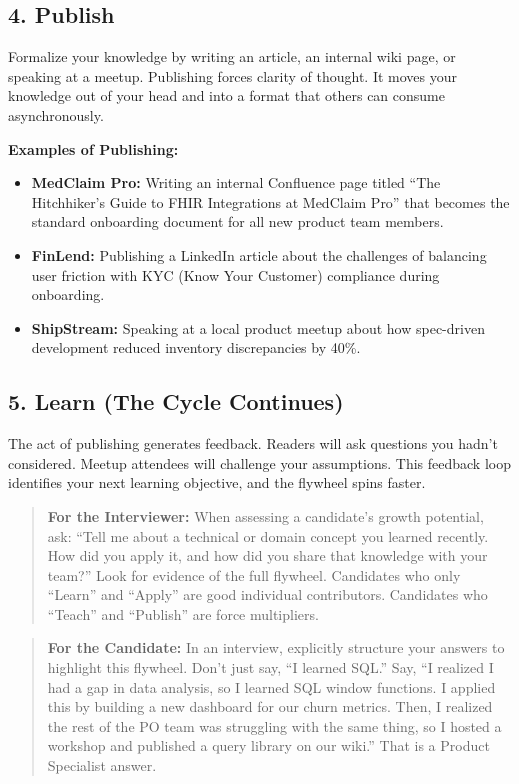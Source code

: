 \subsection{4. Publish}\label{publish}

Formalize your knowledge by writing an article, an internal wiki page,
or speaking at a meetup. Publishing forces clarity of thought. It moves
your knowledge out of your head and into a format that others can
consume asynchronously.

\textbf{Examples of Publishing:}

\begin{itemize}
\tightlist
\item
  \textbf{MedClaim Pro:} Writing an internal Confluence page titled
  ``The Hitchhiker's Guide to FHIR Integrations at MedClaim Pro'' that
  becomes the standard onboarding document for all new product team
  members.
\item
  \textbf{FinLend:} Publishing a LinkedIn article about the challenges
  of balancing user friction with KYC (Know Your Customer) compliance
  during onboarding.
\item
  \textbf{ShipStream:} Speaking at a local product meetup about how
  spec-driven development reduced inventory discrepancies by 40\%.
\end{itemize}

\subsection{5. Learn (The Cycle
Continues)}\label{learn-the-cycle-continues}

The act of publishing generates feedback. Readers will ask questions you
hadn't considered. Meetup attendees will challenge your assumptions.
This feedback loop identifies your next learning objective, and the
flywheel spins faster.

\begin{quote}
\textbf{For the Interviewer:} When assessing a candidate's growth
potential, ask: ``Tell me about a technical or domain concept you
learned recently. How did you apply it, and how did you share that
knowledge with your team?'' Look for evidence of the full flywheel.
Candidates who only ``Learn'' and ``Apply'' are good individual
contributors. Candidates who ``Teach'' and ``Publish'' are force
multipliers.
\end{quote}

\begin{quote}
\textbf{For the Candidate:} In an interview, explicitly structure your
answers to highlight this flywheel. Don't just say, ``I learned SQL.''
Say, ``I realized I had a gap in data analysis, so I learned SQL window
functions. I applied this by building a new dashboard for our churn
metrics. Then, I realized the rest of the PO team was struggling with
the same thing, so I hosted a workshop and published a query library on
our wiki.'' That is a Product Specialist answer.
\end{quote}

